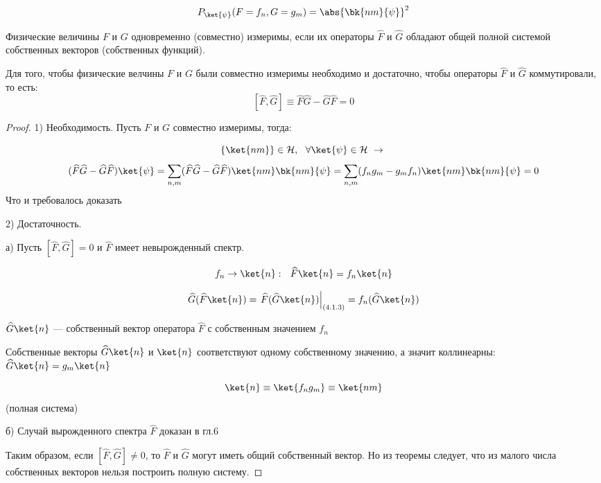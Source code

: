 \begin{exmpl}
$$P_{\ket{\psi}}(F = f_n, G = g_m) = \abs{\bk{nm}{\psi}}^2$$

\begin{defn}
Физические величины $F$ и $G$ одновременно (совместно) измеримы, если их операторы $\widehat{F}$ и $\widehat{G}$ обладают общей полной системой собственных векторов (собственных функций).
\end{defn}

\begin{thm}\label{theorema_iv_chapter}
Для того, чтобы физические велчины $F$ и $G$ были совместно измеримы необходимо и достаточно, чтобы операторы $\widehat{F}$ и $\widehat{G}$ коммутировали, то есть: 
$$[\widehat{F}, \widehat{G}] \equiv \widehat{F}\widehat{G} - \widehat{G}\widehat{F} = 0$$
\end{thm}

\begin{proof}
1) Необходимость. Пусть $F$ и $G$ совместно измеримы, тогда:

$$ \{\ket{nm}\} \in \mathcal{H},~~ \forall \ket{\psi} \in \mathcal{H} ~\rightarrow ~$$
$$(\widehat{F}\widehat{G} - \widehat{G}\widehat{F}) \ket{\psi} = \sum_{n,m} (\widehat{F}\widehat{G} - \widehat{G}\widehat{F}) \ket{nm}\bk{nm}{\psi} = \sum_{n,m} (f_n g_m - g_m f_n) \ket{nm}\bk{nm}{\psi} = 0$$
Что и требовалось доказать

2) Достаточность. 

а) Пусть $[\widehat{F}, \widehat{G}] = 0$ и $\widehat{F}$ имеет невырожденный спектр.

\begin{equation}
\label{eq:4_1_3}
f_n \rightarrow \ket{n}:~~ \widehat{F} \ket{n} = f_n \ket{n}
\end{equation}

$$\widehat{G}(\widehat{F} \ket{n}) = \left. \widehat{F}(\widehat{G}\ket{n}) \right|_{(4.1.3)} = f_n (\widehat{G}\ket{n})$$

$\widehat{G} \ket{n}$ --- собственный вектор оператора $\widehat{F}$ с собственным значением $f_n$

Собственные векторы $\widehat{G} \ket{n}$ и $\ket{n}$ соответствуют одному собственному значению, а значит коллинеарны: $\widehat{G} \ket{n} = g_m \ket{n}$

$$\ket{n} \equiv \ket{f_n g_m} \equiv \ket{nm}$$ (полная система)

б) Случай вырожденного спектра $\widehat{F}$ доказан в гл.6

Таким образом, если $[\widehat{F},\widehat{G}]\ne0$, то $\widehat{F}$ и $\widehat{G}$ могут иметь общий собственный вектор. Но из теоремы следует, что из малого числа собственных векторов нельзя построить полную систему.
\end{proof}


\end{exmpl}
